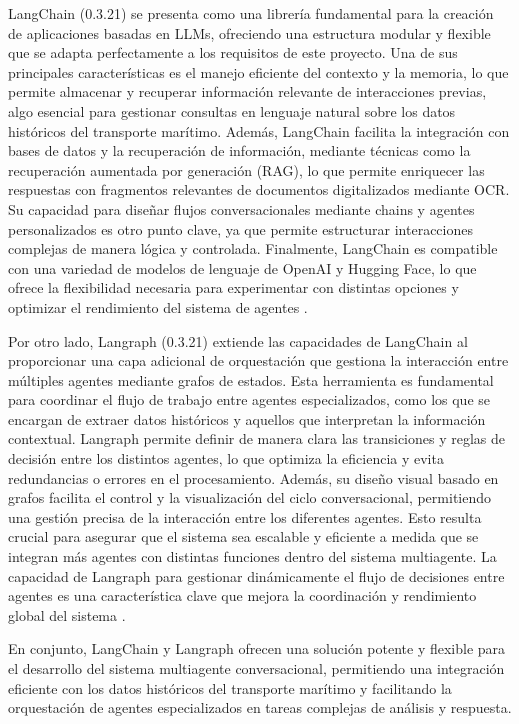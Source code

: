 LangChain (0.3.21) se presenta como una librería fundamental para la creación de aplicaciones basadas en LLMs, ofreciendo una estructura modular y flexible que se adapta perfectamente a los requisitos de este proyecto. Una de sus principales características es el manejo eficiente del contexto y la memoria, lo que permite almacenar y recuperar información relevante de interacciones previas, algo esencial para gestionar consultas en lenguaje natural sobre los datos históricos del transporte marítimo. Además, LangChain facilita la integración con bases de datos y la recuperación de información, mediante técnicas como la recuperación aumentada por generación (RAG), lo que permite enriquecer las respuestas con fragmentos relevantes de documentos digitalizados mediante OCR. Su capacidad para diseñar flujos conversacionales mediante chains y agentes personalizados es otro punto clave, ya que permite estructurar interacciones complejas de manera lógica y controlada. Finalmente, LangChain es compatible con una variedad de modelos de lenguaje de OpenAI y Hugging Face, lo que ofrece la flexibilidad necesaria para experimentar con distintas opciones y optimizar el rendimiento del sistema de agentes \cite{langchain2023}.

Por otro lado, Langraph (0.3.21) extiende las capacidades de LangChain al proporcionar una capa adicional de orquestación que gestiona la interacción entre múltiples agentes mediante grafos de estados. Esta herramienta es fundamental para coordinar el flujo de trabajo entre agentes especializados, como los que se encargan de extraer datos históricos y aquellos que interpretan la información contextual. Langraph permite definir de manera clara las transiciones y reglas de decisión entre los distintos agentes, lo que optimiza la eficiencia y evita redundancias o errores en el procesamiento. Además, su diseño visual basado en grafos facilita el control y la visualización del ciclo conversacional, permitiendo una gestión precisa de la interacción entre los diferentes agentes. Esto resulta crucial para asegurar que el sistema sea escalable y eficiente a medida que se integran más agentes con distintas funciones dentro del sistema multiagente. La capacidad de Langraph para gestionar dinámicamente el flujo de decisiones entre agentes es una característica clave que mejora la coordinación y rendimiento global del sistema \cite{langraph2023}.

En conjunto, LangChain y Langraph ofrecen una solución potente y flexible para el desarrollo del sistema multiagente conversacional, permitiendo una integración eficiente con los datos históricos del transporte marítimo y facilitando la orquestación de agentes especializados en tareas complejas de análisis y respuesta.

